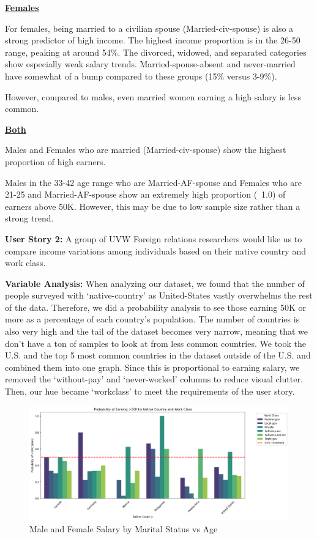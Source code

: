 \documentclass[journal,onecolumn]{IEEEtran}
\begin{document}
\underline{\textbf{Females}}

For females, being married to a civilian spouse (Married-civ-spouse) is also a strong predictor of high income.
The highest income proportion is in the 26-50 range, peaking at around 54\%.
The divorced, widowed, and separated categories show especially weak salary trends.
Married-spouse-absent and never-married have somewhat of a bump compared to these groups (15\% versus 3-9\%).

However, compared to males, even married women earning a high salary is less common.


\underline{\textbf{Both}}

Males and Females who are married (Married-civ-spouse) show the highest proportion of high earners.


Males in the 33-42 age range who are Married-AF-spouse and Females who are 21-25 and Married-AF-spouse
show an extremely high proportion (~1.0) of earners above 50K. However, this may be due to low sample size rather than a strong trend. 

\textbf{User Story 2:} A group of UVW Foreign relations researchers would like us to compare income variations among individuals based on their native country and work class.

\textbf{Variable Analysis:} When analyzing our dataset, we found that the number of people surveyed with `native-country' as United-States vastly overwhelms the rest of the data. 
Therefore, we did a probability analysis to see those earning 50K or more as a percentage of each country's population. The number of countries is also very high and
the tail of the dataset becomes very narrow, meaning that we don't have a ton of samples to look at from less common countries. 
We took the U.S. and the top 5 most common countries in the dataset outside of the U.S. and combined them into one graph. 
Since this is proportional to earning salary, we removed the `without-pay' and `never-worked' columns to reduce visual clutter.
Then, our hue became `workclass' to meet the requirements of the user story.

\begin{figure}[h]
    \centering
    \includegraphics[width=1.05\linewidth]{country-workclass.png}  %
    \caption{Male and Female Salary by Marital Status vs Age}
    \label{fig:mf_marital_agebins}
\end{figure}
\end{document}
